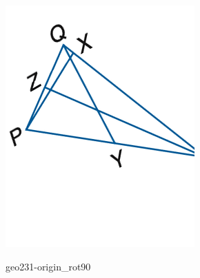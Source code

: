 \documentclass[12pt]{article}
\begin{document}
\begin{center}
\begin{minipage}{0.32\textwidth}
\includegraphics[width=0.95\linewidth]{out_rommath_origin/items/geo231-origin/assets/figure_rot30.png}
\end{minipage}
\hfill\begin{minipage}{0.32\textwidth}\centering
geo231-origin\_rot90\\

\end{minipage}
\end{center}
\end{document}
